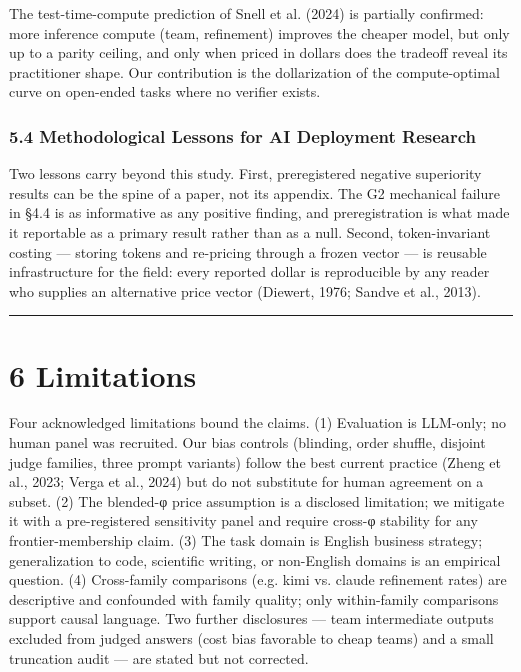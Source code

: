 \documentclass[11pt,a4paper]{article}
\begin{document}
The test-time-compute prediction of Snell et al. (2024) is partially
confirmed: more inference compute (team, refinement) improves the
cheaper model, but only up to a parity ceiling, and only when priced
in dollars does the tradeoff reveal its practitioner shape. Our
contribution is the dollarization of the compute-optimal curve on
open-ended tasks where no verifier exists.

\subsubsection{5.4 Methodological Lessons for AI Deployment Research}

Two lessons carry beyond this study. First, preregistered negative
superiority results can be the spine of a paper, not its appendix.
The G2 mechanical failure in §4.4 is as informative as any positive
finding, and preregistration is what made it reportable as a primary
result rather than as a null. Second, token-invariant costing —
storing tokens and re-pricing through a frozen vector — is reusable
infrastructure for the field: every reported dollar is reproducible
by any reader who supplies an alternative price vector (Diewert,
1976; Sandve et al., 2013).

\hrule


\section{6 Limitations}

Four acknowledged limitations bound the claims. (1) Evaluation is
LLM-only; no human panel was recruited. Our bias controls (blinding,
order shuffle, disjoint judge families, three prompt variants) follow
the best current practice (Zheng et al., 2023; Verga et al., 2024)
but do not substitute for human agreement on a subset. (2) The
blended-φ price assumption is a disclosed limitation; we mitigate it
with a pre-registered sensitivity panel and require cross-φ stability
for any frontier-membership claim. (3) The task domain is English
business strategy; generalization to code, scientific writing, or
non-English domains is an empirical question. (4) Cross-family
comparisons (e.g. kimi vs. claude refinement rates) are descriptive
and confounded with family quality; only within-family comparisons
support causal language. Two further disclosures — team intermediate
outputs excluded from judged answers (cost bias favorable to cheap
teams) and a small truncation audit — are stated but not corrected.
\end{document}
